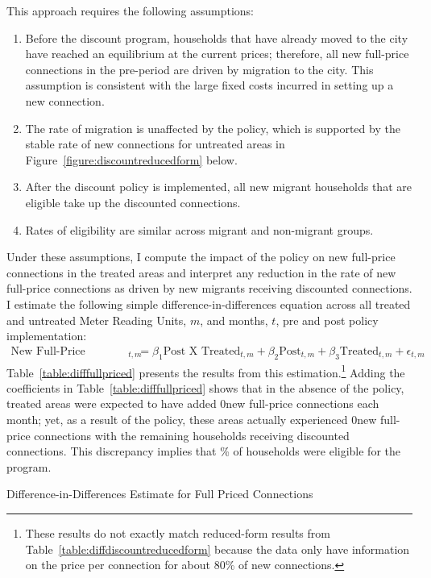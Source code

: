 \documentclass[12pt]{article}
\begin{document}
This approach requires the following assumptions:
\begin{enumerate}
	\item Before the discount program, households that have already moved to the city have reached an equilibrium at the current prices; therefore, all new full-price connections in the pre-period are driven by migration to the city.  This assumption is consistent with the large fixed costs incurred in setting up a new connection.
	\item The rate of migration is unaffected by the policy, which is supported by the stable rate of new connections for untreated areas in Figure~\ref{figure:discountreducedform} below.  
	\item After the discount policy is implemented, all new migrant households that are eligible take up the discounted connections.
	\item Rates of eligibility are similar across migrant and non-migrant groups.
\end{enumerate}
Under these assumptions, I compute the impact of the policy on new full-price connections in the treated areas and interpret any reduction in the rate of new full-price connections as driven by new migrants receiving discounted connections.  I estimate the following simple difference-in-differences equation across all treated and untreated Meter Reading Units, $m$, and months, $t$, pre and post policy implementation:
\begin{align*}
\text{New Full-Price Connections}_{t,m} &= \beta_1 \text{Post X Treated}_{t,m} + \beta_2 \text{Post}_{t,m} + \beta_3 \text{Treated}_{t,m} + \epsilon_{t,m}
\end{align*}
Table~\ref{table:difffullpriced} presents the results from this estimation.\footnote{These results do not exactly match reduced-form results from Table~\ref{table:diffdiscountreducedform} because the data only have information on the price per connection for about 80\% of new connections.}  Adding the coefficients in Table~\ref{table:difffullpriced} shows that in the absence of the policy, treated areas were expected to have added 0new full-price connections each month; yet, as a result of the policy, these areas actually experienced 0new full-price connections with the remaining households receiving discounted connections.  This discrepancy implies that \unskip\% of households were eligible for the program.

\begin{table}
\centering
\caption{Difference-in-Differences Estimate for Full Priced Connections}\label{table:difffullpriced}

\end{table}
\end{document}
